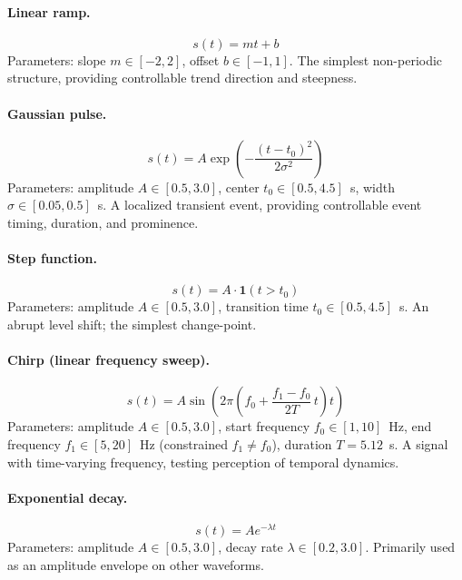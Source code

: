 \documentclass[11pt]{article}
\begin{document}
\paragraph{Linear ramp.}
\begin{equation}
    s(t) = mt + b
\end{equation}
Parameters: slope $m \in [-2, 2]$, offset $b \in [-1, 1]$. The simplest non-periodic structure, providing controllable trend direction and steepness.

\paragraph{Gaussian pulse.}
\begin{equation}
    s(t) = A \exp\!\left(-\frac{(t - t_0)^2}{2\sigma^2}\right)
\end{equation}
Parameters: amplitude $A \in [0.5, 3.0]$, center $t_0 \in [0.5, 4.5]$~s, width $\sigma \in [0.05, 0.5]$~s. A localized transient event, providing controllable event timing, duration, and prominence.

\paragraph{Step function.}
\begin{equation}
    s(t) = A \cdot \mathbf{1}(t > t_0)
\end{equation}
Parameters: amplitude $A \in [0.5, 3.0]$, transition time $t_0 \in [0.5, 4.5]$~s. An abrupt level shift; the simplest change-point.

\paragraph{Chirp (linear frequency sweep).}
\begin{equation}
    s(t) = A \sin\!\left(2\pi\!\left(f_0 + \frac{f_1 - f_0}{2T}\,t\right)t\right)
\end{equation}
Parameters: amplitude $A \in [0.5, 3.0]$, start frequency $f_0 \in [1, 10]$~Hz, end frequency $f_1 \in [5, 20]$~Hz (constrained $f_1 \neq f_0$), duration $T = 5.12$~s. A signal with time-varying frequency, testing perception of temporal dynamics.

\paragraph{Exponential decay.}
\begin{equation}
    s(t) = A e^{-\lambda t}
\end{equation}
Parameters: amplitude $A \in [0.5, 3.0]$, decay rate $\lambda \in [0.2, 3.0]$. Primarily used as an amplitude envelope on other waveforms.
\end{document}

